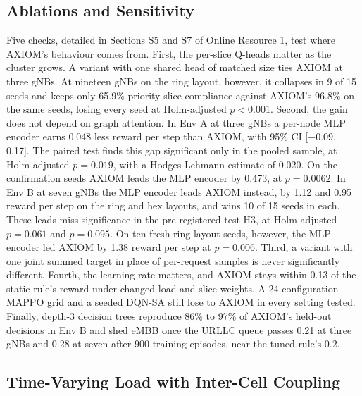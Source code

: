 \documentclass[pdflatex,sn-basic,Numbered]{sn-jnl}
\begin{document}
\subsection{Ablations and Sensitivity}
\label{sec:results-ablation}
Five checks, detailed in Sections S5 and S7 of Online Resource 1, test where AXIOM's behaviour comes from. First, the per-slice Q-heads matter as the cluster grows. A variant with one shared head of matched size ties AXIOM at three gNBs. At nineteen gNBs on the ring layout, however, it collapses in 9 of 15 seeds and keeps only 65.9\% priority-slice compliance against AXIOM's 96.8\% on the same seeds, losing every seed at Holm-adjusted $p<0.001$. Second, the gain does not depend on graph attention. In Env A at three gNBs a per-node MLP encoder earns 0.048 less reward per step than AXIOM, with 95\% CI [$-$0.09, 0.17]. The paired test finds this gap significant only in the pooled sample, at Holm-adjusted $p=0.019$, with a Hodges-Lehmann estimate of 0.020. On the confirmation seeds AXIOM leads the MLP encoder by 0.473, at $p=0.0062$. In Env B at seven gNBs the MLP encoder leads AXIOM instead, by 1.12 and 0.95 reward per step on the ring and hex layouts, and wins 10 of 15 seeds in each. These leads miss significance in the pre-registered test H3, at Holm-adjusted $p=0.061$ and $p=0.095$. On ten fresh ring-layout seeds, however, the MLP encoder led AXIOM by 1.38 reward per step at $p=0.006$. Third, a variant with one joint summed target in place of per-request samples is never significantly different. Fourth, the learning rate matters, and AXIOM stays within 0.13 of the static rule's reward under changed load and slice weights. A 24-configuration MAPPO grid and a seeded DQN-SA still lose to AXIOM in every setting tested. Finally, depth-3 decision trees reproduce 86\% to 97\% of AXIOM's held-out decisions in Env B and shed eMBB once the URLLC queue passes 0.21 at three gNBs and 0.28 at seven after 900 training episodes, near the tuned rule's 0.2.

\subsection{Time-Varying Load with Inter-Cell Coupling}
\label{sec:results-envb}
\end{document}
